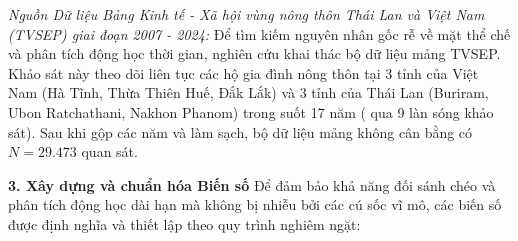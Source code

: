\documentclass[12pt,a4paper]{article}
\begin{document}
\textit{Nguồn Dữ liệu Bảng Kinh tế - Xã hội vùng nông thôn Thái Lan và Việt Nam (TVSEP) giai đoạn 2007 - 2024:\textcite{tvsep2007}} 
Để tìm kiếm nguyên nhân gốc rễ về mặt thể chế và phân tích động học thời gian, nghiên cứu khai thác bộ dữ liệu mảng TVSEP. Khảo sát này theo dõi liên tục các hộ gia đình nông thôn tại 3 tỉnh của Việt Nam (Hà Tĩnh, Thừa Thiên Huế, Đắk Lắk) và 3 tỉnh của Thái Lan (Buriram, Ubon Ratchathani, Nakhon Phanom) trong suốt 17 năm ( qua 9 làn sóng khảo sát). Sau khi gộp các năm và làm sạch, bộ dữ liệu mảng không cân bằng có $N = 29.473$ quan sát.

\clearpage
\textbf{3. Xây dựng và chuẩn hóa Biến số}
Để đảm bảo khả năng đối sánh chéo và phân tích động học dài hạn mà không bị nhiễu bởi các cú sốc vĩ mô, các biến số được định nghĩa và thiết lập theo quy trình nghiêm ngặt:
\end{document}

